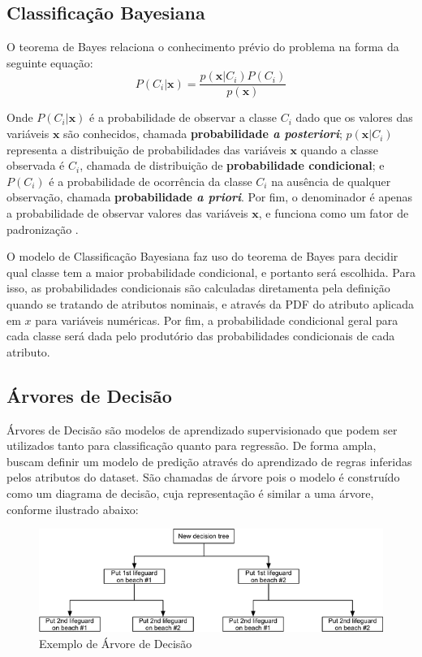 \documentclass{homework}
\begin{document}
\subsection{Classificação Bayesiana}

O teorema de Bayes relaciona o conhecimento prévio do problema na forma da seguinte equação:
\begin{equation}
    P(C_i|\mathbf{x}) = \frac{p(\mathbf{x}|C_i)P(C_i)}{p(\mathbf{x})}
\end{equation}

Onde $P(C_i|\mathbf{x})$ é a probabilidade de observar a classe $C_i$ dado que os valores das variáveis $\mathbf{x}$ são
conhecidos, chamada \textbf{probabilidade \textit{a posteriori}}; $p(\mathbf{x}|C_i)$ representa a distribuição de
probabilidades das variáveis $\mathbf{x}$ quando a classe observada é $C_i$, chamada de distribuição de 
\textbf{probabilidade condicional}; e $P(C_i)$ é a probabilidade de ocorrência da classe $C_i$ na ausência de qualquer
observação, chamada \textbf{probabilidade \textit{a priori}}. Por fim, o denominador é apenas a probabilidade de
observar valores das variáveis $\mathbf{x}$, e funciona como um fator de padronização \cite{evsukoff}.

O modelo de Classificação Bayesiana faz uso do teorema de Bayes para decidir qual classe tem a maior probabilidade
condicional, e portanto será escolhida. Para isso, as probabilidades condicionais são calculadas diretamenta pela
definição quando se tratando de atributos nominais, e através da PDF do atributo aplicada em $x$ para variáveis
numéricas. Por fim, a probabilidade condicional geral para cada classe será dada pelo produtório das probabilidades
condicionais de cada atributo.

\subsection{Árvores de Decisão}
\label{dt}

Árvores de Decisão são modelos de aprendizado supervisionado que podem ser utilizados tanto para classificação quanto
para regressão. De forma ampla, buscam definir um modelo de predição através do aprendizado de regras inferidas pelos
atributos do dataset. São chamadas de árvore pois o modelo é construído como um diagrama de decisão, cuja representação
é similar a uma árvore, conforme ilustrado abaixo:

\begin{figure}[htbp]
    \centerline{\includegraphics[scale=2]{decision_tree.png}}
    \label{decision_tree}
    \caption{Exemplo de Árvore de Decisão \cite{decision_tree}}
\end{figure}
\end{document}
